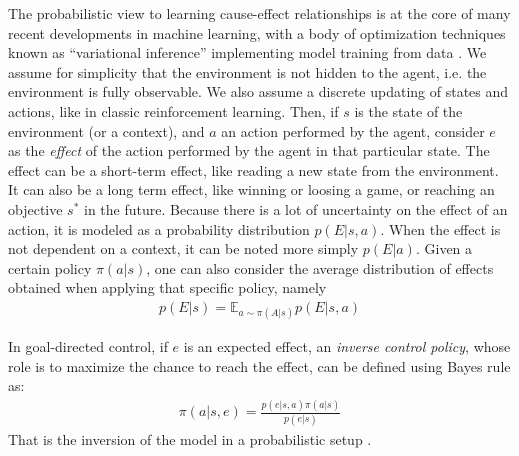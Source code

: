 \documentclass[runningheads]{llncs}
\begin{document}
The probabilistic view to learning cause-effect relationships is at the core of many recent developments in machine learning, with a body of optimization techniques known as “variational inference” implementing model training from data \cite{kingma2013auto}. 
We assume for simplicity that the environment is not hidden to the agent, i.e. the environment is fully observable. We also assume a discrete updating of states and actions, like in classic reinforcement learning.
Then, if $s$ is the state of the environment (or a context), and $a$ an action performed by the agent, consider $e$ as the \emph{effect} of the action performed by the agent in that particular state. The effect can be a short-term effect, like reading a new state from the environment. It can also be a long term effect, like winning or loosing a game, or reaching an objective $s^*$ in the future. Because there is a lot of uncertainty on the effect of an action, it is modeled as a probability distribution $p(E|s,a)$.
When the effect is not dependent on a context, it can be noted more simply $p(E|a)$.
Given a certain policy $\pi(a|s)$, one can also consider the average distribution of effects obtained when applying that specific policy, namely 
\begin{align}\label{eq:effect-model}
p(E|s) = \mathbb{E}_{a\sim \pi(A|s)} p(E|s,a)
\end{align}  

In goal-directed control, if $e$ is an expected effect, an \emph{inverse control policy}, whose role is to maximize the chance to reach the effect, can be defined using Bayes rule as:
\begin{align}\label{eq:inv-policy}
\pi(a|s,e) = \frac{p(e|s,a)\pi(a|s)}{p(e|s)}
\end{align}
That is the inversion of the model in a probabilistic setup \cite{bays2007computational}. 
\end{document}
